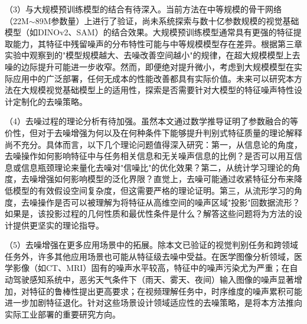 （3）与大规模预训练模型的结合有待深入。当前方法在中等规模的骨干网络（22M$\sim$89M参数量）上进行了验证，尚未系统探索与数十亿参数规模的视觉基础模型（如DINOv2\cite{oquab2023dinov2}、SAM\cite{kirillov2023segment}）的结合效果。大规模预训练模型通常具有更强的特征提取能力，其特征中残留噪声的分布特性可能与中等规模模型存在差异。根据第三章实验中观察到的"模型规模越大、去噪改善空间越小"的规律，在超大规模模型上去噪的边际提升可能进一步收窄。然而，即便绝对提升微小，考虑到大规模模型在实际应用中的广泛部署，任何无成本的性能改善都具有实际价值。未来可以研究本方法在大规模视觉基础模型上的适用性，探索是否需要针对大模型的特征噪声特性设计定制化的去噪策略。

（4）去噪过程的理论分析有待加强。虽然本文通过数学推导证明了参数融合的等价性，但对于去噪增强为何以及在何种条件下能够提升判别式特征质量的理论解释尚不充分。具体而言，以下几个理论问题值得深入研究：第一，从信息论的角度，去噪操作如何影响特征中与任务相关信息和无关噪声信息的比例？是否可以用互信息或信息瓶颈理论来量化去噪对"信噪比"的优化效果？第二，从统计学习理论的角度，去噪增强如何影响模型的泛化界限？直觉上，去噪可能通过收紧特征分布来降低模型的有效假设空间复杂度，但这需要严格的理论证明。第三，从流形学习的角度，去噪操作是否可以被理解为将特征从高维空间的噪声区域"投影"回数据流形？如果是，该投影过程的几何性质和最优性条件是什么？解答这些问题将为方法的设计提供更坚实的理论指导。

（5）去噪增强在更多应用场景中的拓展。除本文已验证的视觉判别任务和跨领域任务外，许多其他应用场景也可能从特征级去噪中受益。在医学图像分析领域，医学影像（如CT、MRI）固有的噪声水平较高，特征中的噪声污染尤为严重；在自动驾驶感知系统中，恶劣天气条件下（雨天、雾天、夜间）输入图像的噪声显著增加，对特征的鲁棒性提出更高要求；在视频理解任务中，时序维度的噪声累积可能进一步加剧特征退化。针对这些场景设计领域适应性的去噪策略，是将本方法推向实际工业部署的重要研究方向。